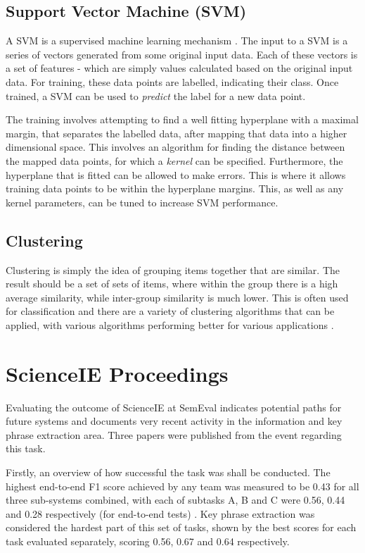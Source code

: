\subsection*{Support Vector Machine (SVM)}
A SVM is a supervised machine learning mechanism \cite{Chih-WeiHsuChih-ChungChang2008}. The input to a SVM is a series of vectors generated from some original input data. Each of these vectors is a set of features - which are simply values calculated based on the original input data. For training, these data points are labelled, indicating their class. Once trained, a SVM can be used to \textit{predict} the label for a new data point.

The training involves attempting to find a well fitting hyperplane with a maximal margin, that separates the labelled data, after mapping that data into a higher dimensional space. This involves an algorithm for finding the distance between the mapped data points, for which a \textit{kernel} can be specified. Furthermore, the hyperplane that is fitted can be allowed to make errors. This is where it allows training data points to be within the hyperplane margins. This, as well as any kernel parameters, can be tuned to increase SVM performance.

\subsection*{Clustering}
Clustering is simply the idea of grouping items together that are similar. The result should be a set of sets of items, where within the group there is a high average similarity, while inter-group similarity is much lower. This is often used for classification and there are a variety of clustering algorithms that can be applied, with various algorithms performing better for various applications \cite{Rai2010}.

\section{ScienceIE Proceedings}
Evaluating the outcome of ScienceIE at SemEval indicates potential paths for future systems and documents very recent activity in the information and key phrase extraction area. Three papers were published from the event regarding this task.

Firstly, an overview of how successful the task was shall be conducted. The highest end-to-end F1 score achieved by any team was measured to be 0.43 for all three sub-systems combined, with each of subtasks A, B and C were 0.56, 0.44 and 0.28 respectively (for end-to-end tests) \cite{Augenstein2017}. Key phrase extraction was considered the hardest part of this set of tasks, shown by the best scores for each task evaluated separately, scoring 0.56, 0.67 and 0.64 respectively.

